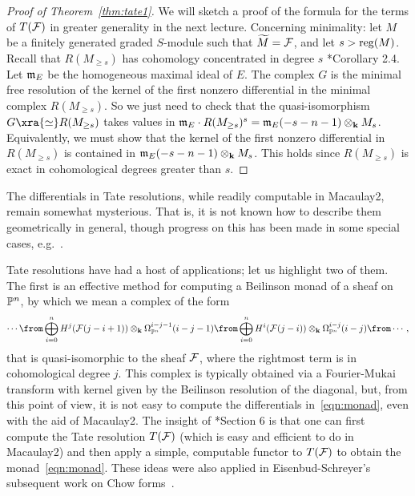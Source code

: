 \documentclass{amsart}
\begin{document}
\begin{proof}[Proof of Theorem~\ref{thm:tate1}]
We will sketch a proof of the formula for the terms of $T(\mathcal{F})$ in greater generality in the next lecture. Concerning minimality: let $M$ be a finitely generated graded $S$-module such that $\widetilde{M} = \mathcal{F}$, and let $s > \operatorname{reg}(M)$. Recall that $R(M_{\ge s})$ has cohomology concentrated in degree $s$ \cite{EFS03}*{Corollary 2.4}. Let $\mathfrak m_E$ be the homogeneous maximal ideal of $E$. The complex $G$ is the minimal free resolution of the kernel of the first nonzero differential in the minimal complex $R(M_{\ge s})$. So we just need to check that the quasi-isomorphism $G \xra{\simeq} R(M_{\ge s})$ takes values in $\mathfrak m_E \cdot R(M_{\ge s})^{s} = \mathfrak m_E(-s-n-1) \otimes_{\mathbf{k}} M_s$. Equivalently, we must show that the kernel of the first nonzero differential in $R(M_{\ge s})$ is contained in $\mathfrak m_E(-s-n-1) \otimes_{\mathbf{k}} M_s$. This holds since $R(M_{\ge s})$ is exact in cohomological degrees greater than $s$.
\end{proof}

\begin{remark}
The differentials in Tate resolutions, while readily computable in Macaulay2, remain somewhat mysterious. That is, it is not known how to describe them geometrically in general, though progress on this has been made in some special cases, e.g.~\cite{Cox07,CM08}.
\end{remark}

Tate resolutions have had a host of applications; let us highlight two of them. The first is an effective method for computing a Beilinson monad of a sheaf on $\mathbb P^n$, by which we mean a complex of the form
\begin{equation}
\label{eqn:monad}
\cdots
\from
\bigoplus_{i = 0}^n H^j(\F(j-i+1)) \otimes_\kk \Omega_{\PP^n}^{i-j-1}(i-j - 1)
\from
\bigoplus_{i = 0}^n H^i(\F(j-i)) \otimes_\kk \Omega_{\PP^n}^{i-j}(i-j)\from \cdots,
\end{equation}
that is quasi-isomorphic to the sheaf $\mathcal{F}$, where the rightmost term is in cohomological degree $j$. This complex is typically obtained via a Fourier-Mukai transform with kernel given by the Beilinson resolution of the diagonal, but, from this point of view, it is not easy to compute the differentials in~\eqref{eqn:monad}, even with the aid of Macaulay2. The insight of \cite{EFS03}*{Section 6} is that one can first compute the Tate resolution $T(\mathcal{F})$ (which is easy and efficient to do in Macaulay2) and then apply a simple, computable functor to $T(\mathcal{F})$ to obtain the monad~\eqref{eqn:monad}. These ideas were also applied in Eisenbud-Schreyer's subsequent work on Chow forms~\cite{ES03}.
\end{document}

